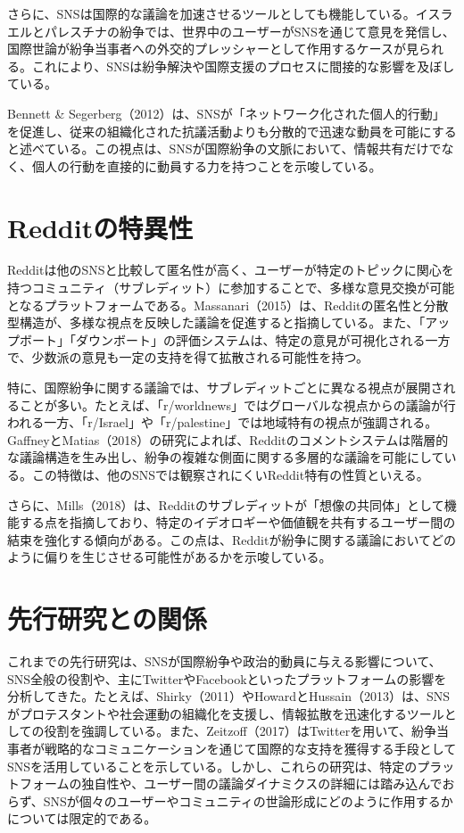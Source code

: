 \documentclass[11pt, a4j]{jreport}
\begin{document}
    さらに、SNSは国際的な議論を加速させるツールとしても機能している。イスラエルとパレスチナの紛争では、世界中のユーザーがSNSを通じて意見を発信し、国際世論が紛争当事者への外交的プレッシャーとして作用するケースが見られる。これにより、SNSは紛争解決や国際支援のプロセスに間接的な影響を及ぼしている。

    Bennett \& Segerberg（2012）は、SNSが「ネットワーク化された個人的行動」を促進し、従来の組織化された抗議活動よりも分散的で迅速な動員を可能にすると述べている。この視点は、SNSが国際紛争の文脈において、情報共有だけでなく、個人の行動を直接的に動員する力を持つことを示唆している。

    \section{Redditの特異性}
    Redditは他のSNSと比較して匿名性が高く、ユーザーが特定のトピックに関心を持つコミュニティ（サブレディット）に参加することで、多様な意見交換が可能となるプラットフォームである。Massanari（2015）は、Redditの匿名性と分散型構造が、多様な視点を反映した議論を促進すると指摘している。また、「アップボート」「ダウンボート」の評価システムは、特定の意見が可視化される一方で、少数派の意見も一定の支持を得て拡散される可能性を持つ。

    特に、国際紛争に関する議論では、サブレディットごとに異なる視点が展開されることが多い。たとえば、「r/worldnews」ではグローバルな視点からの議論が行われる一方、「r/Israel」や「r/palestine」では地域特有の視点が強調される。GaffneyとMatias（2018）の研究によれば、Redditのコメントシステムは階層的な議論構造を生み出し、紛争の複雑な側面に関する多層的な議論を可能にしている。この特徴は、他のSNSでは観察されにくいReddit特有の性質といえる。

    さらに、Mills（2018）は、Redditのサブレディットが「想像の共同体」として機能する点を指摘しており、特定のイデオロギーや価値観を共有するユーザー間の結束を強化する傾向がある。この点は、Redditが紛争に関する議論においてどのように偏りを生じさせる可能性があるかを示唆している。

    \section{先行研究との関係}
    これまでの先行研究は、SNSが国際紛争や政治的動員に与える影響について、SNS全般の役割や、主にTwitterやFacebookといったプラットフォームの影響を分析してきた。たとえば、Shirky（2011）やHowardとHussain（2013）は、SNSがプロテスタントや社会運動の組織化を支援し、情報拡散を迅速化するツールとしての役割を強調している。また、Zeitzoff（2017）はTwitterを用いて、紛争当事者が戦略的なコミュニケーションを通じて国際的な支持を獲得する手段としてSNSを活用していることを示している。しかし、これらの研究は、特定のプラットフォームの独自性や、ユーザー間の議論ダイナミクスの詳細には踏み込んでおらず、SNSが個々のユーザーやコミュニティの世論形成にどのように作用するかについては限定的である。
\end{document}
